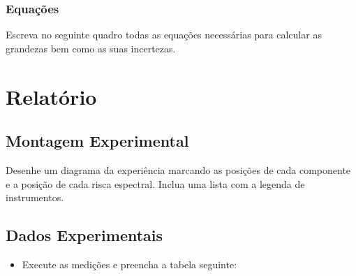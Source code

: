 \documentclass[a4paper,12pt]{article}  %
\begin{document}
\subsubsection{\sf Equações }
Escreva no seguinte quadro todas as equações necessárias para calcular as grandezas bem como as suas incertezas.
\begin{center}
\framebox[15cm]{\rule{0pt}{6.5cm}}
\end{center}


\section{\sf Relatório}
\subsection{\sf Montagem Experimental}
Desenhe um diagrama da experiência marcando as posições de cada componente e a posição de cada risca espectral. Inclua uma lista com a  legenda de instrumentos.

\begin{center}
\framebox[18cm]{\rule{0pt}{6.5cm}}
\end{center}



\subsection{\sf Dados Experimentais}\label{sec:dados}

\begin{itemize}
\item Execute as medições e preencha a tabela seguinte:
\end{itemize}
\end{document}
